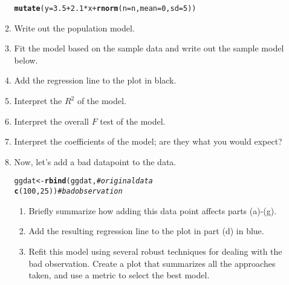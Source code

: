 \documentclass{article}\usepackage[]{graphicx}\usepackage[]{color}
\makeatletter
\newcommand{\hlnum}[1]{\textcolor[rgb]{0.686,0.059,0.569}{#1}}%
\newcommand{\hlcom}[1]{\textcolor[rgb]{0.678,0.584,0.686}{\textit{#1}}}%
\newcommand{\hlopt}[1]{\textcolor[rgb]{0,0,0}{#1}}%
\newcommand{\hlstd}[1]{\textcolor[rgb]{0.345,0.345,0.345}{#1}}%
\newcommand{\hlkwb}[1]{\textcolor[rgb]{0.69,0.353,0.396}{#1}}%
\newcommand{\hlkwc}[1]{\textcolor[rgb]{0.333,0.667,0.333}{#1}}%
\newcommand{\hlkwd}[1]{\textcolor[rgb]{0.737,0.353,0.396}{\textbf{#1}}}%
\newenvironment{kframe}{%
 \def\at@end@of@kframe{}%
 \ifinner\ifhmode%
  \def\at@end@of@kframe{\end{minipage}}%
  \begin{minipage}{\columnwidth}%
 \fi\fi%
 \def\FrameCommand##1{\hskip\@totalleftmargin \hskip-\fboxsep
 \colorbox{shadecolor}{##1}\hskip-\fboxsep
     \hskip-\linewidth \hskip-\@totalleftmargin \hskip\columnwidth}%
 \MakeFramed {\advance\hsize-\width
   \@totalleftmargin\z@ \linewidth\hsize
   \@setminipage}}%
 {\par\unskip\endMakeFramed%
 \at@end@of@kframe}
\newenvironment{knitrout}{}{} %
\makeatother
\begin{document}
\begin{enumerate}
\begin{enumerate}
\begin{knitrout}
\begin{kframe}
\begin{alltt}
  \hlkwd{mutate}\hlstd{(}\hlkwc{y}\hlstd{=}\hlnum{3.5}\hlopt{+}\hlnum{2.1}\hlopt{*}\hlstd{x}\hlopt{+}\hlkwd{rnorm}\hlstd{(}\hlkwc{n}\hlstd{=n,}\hlkwc{mean}\hlstd{=}\hlnum{0}\hlstd{,}\hlkwc{sd}\hlstd{=}\hlnum{5}\hlstd{))}
\end{alltt}
\end{kframe}
\end{knitrout}
    \item Write out the population model.
    \item Fit the model based on the sample data and write out the sample model below.
    \item Add the regression line to the plot in black.
    \item Interpret the $R^2$ of the model.
    \item Interpret the overall $F$ test of the model.
    \item Interpret the coefficients of the model; are they what you would expect?
    \item Now, let's add a bad datapoint to the data.
\begin{knitrout}
\color{fgcolor}\begin{kframe}
\begin{alltt}
\hlstd{ggdat} \hlkwb{<-} \hlkwd{rbind}\hlstd{(ggdat,}     \hlcom{# original data}
               \hlkwd{c}\hlstd{(}\hlnum{100}\hlstd{,}\hlnum{25}\hlstd{))} \hlcom{# bad observation}
\end{alltt}
\end{kframe}
\end{knitrout}
  \begin{enumerate}
    \item Briefly summarize how adding this data point affects parts (a)-(g).
    \item Add the resulting regression line to the plot in part (d) in blue.
    \item Refit this model using several robust techniques for dealing with the
    bad observation. Create a plot that summarizes all the approaches taken, and 
    use a metric to select the best model.
  \end{enumerate}
  \end{enumerate}
\end{enumerate}
\newpage

\end{document}

